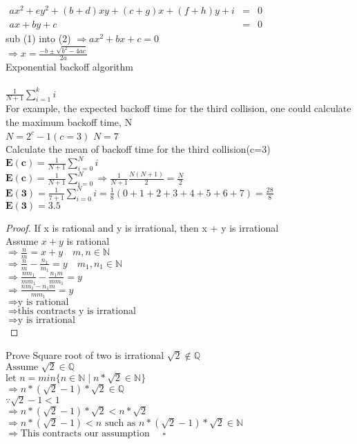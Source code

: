 \documentclass{book}
\begin{document}
\noindent
$
\begin{array}{lcl}
ax^{2} + ey^{2} + (b+d)xy + (c+g)x + (f+h)y + i &=& 0\\
ax + by + c &=& 0
\end{array}
$\\
sub (1) into (2) 
$\Rightarrow ax^{2} + bx + c = 0$\\
$\Rightarrow x = \frac{-b \pm \sqrt{b^{2} - 4ac}}{2a}$
\\

Exponential backoff algorithm\\
\\
$\frac{1}{N+1} \sum_{i=1}^{k}i$\\
For example, the expected backoff time for the third collision, one could 
calculate the maximum backoff time, N\\
$N = 2^{c} - 1 (c = 3)$
$N = 7$\\
Calculate the mean of backoff time for the third collision(c=3)\\
$\mathbf{E(c)} = \frac{1}{N+1}\sum_{i=0}^{N} i$\\
$\mathbf{E(c)} = \frac{1}{N+1}\sum_{i=0}^{N} \Rightarrow \frac{1}{N+1} \frac{N(N+1)}{2} = \frac{N}{2}$\\
$\mathbf{E(3)} = \frac{1}{7+1}\sum_{i=0}^{N} i = \frac{1}{8}(0+1+2+3+4+5+6+7) = \frac{28}{8}$\\
$\mathbf{E(3)} = 3.5$\\

\begin{proof}
If x is rational and y is irrational, then x + y is irrational \\
Assume $x + y$ is rational \\
    $\Rightarrow \frac{n}{m} = x + y  \quad m, n \in  \mathbb{N}$ \\ 
    $\Rightarrow \frac{n}{m} - \frac{n_1}{m_1} = y \quad m_1, n_1 \in  \mathbb{N}$ \\
    $\Rightarrow \frac{n m_1}{m m_1} - \frac{n_1 m}{m m_1} = y$  \\
    $\Rightarrow \frac{n m_1 - n_1 m}{m m_1} = y$  \\
    $\Rightarrow \mbox{y is rational}$  \\
    $\Rightarrow \mbox{this contracts y is irrational}$ \\
    $\Rightarrow \mbox{y is irrational}$ \\
\end{proof}

Prove Square root of two is irrational
$\sqrt{2} \notin \mathbb{Q}$\\
$\text{Assume } \sqrt{2} \in \mathbb{Q}$\\
$\text{let }n = min\{ n \in \mathbb{N} \mid n*\sqrt{2} \in \mathbb{N}\}$\\
$\Rightarrow n*(\sqrt{2} - 1)*\sqrt{2} \in \mathbb{Q}$\\
$\because \sqrt{2} - 1 < 1$\\
$\Rightarrow n*(\sqrt{2} - 1)*\sqrt{2} < n*\sqrt{2}$\\
$\Rightarrow n*(\sqrt{2} - 1) < n \text{ such as } n*(\sqrt{2} - 1)*\sqrt{2} \in \mathbb{N}$\\
$\Rightarrow \text{This contracts our assumption } \quad \square$\\
\end{document}
